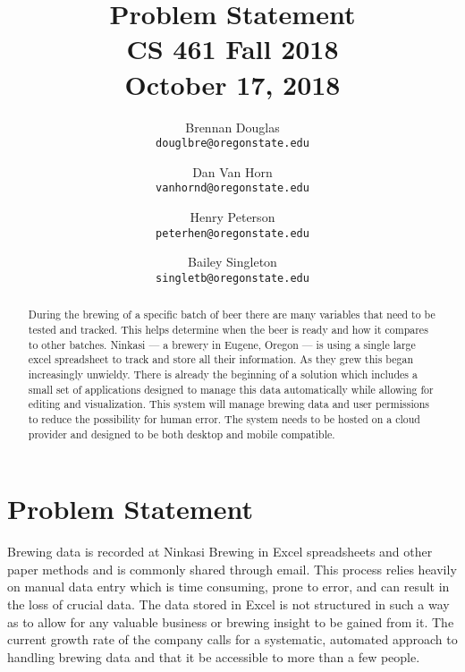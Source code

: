 \documentclass[draftclsnofoot,onecolumn,journal,letterpaper,10pt]{IEEEtran}
\begin{document}
\begin{titlepage}
    \title{Problem Statement\\\large CS 461 Fall 2018 \\ October 17, 2018}
    \author{
        Brennan Douglas \\
        \texttt{douglbre@oregonstate.edu} \\
        \and
        Dan Van Horn \\
        \texttt{vanhornd@oregonstate.edu} \\
        \and
        Henry Peterson \\
        \texttt{peterhen@oregonstate.edu} \\
        \and
        Bailey Singleton \\
        \texttt{singletb@oregonstate.edu} \\
    }
    
    \maketitle
    \begin{abstract}
        During the brewing of a specific batch of beer there are many variables that need to be tested and tracked. This helps determine when the beer is ready and how it compares to other batches. Ninkasi --- a brewery in Eugene, Oregon --- is using a single large excel spreadsheet to track and store all their information. As they grew this began increasingly unwieldy.  There is already the beginning of a solution which includes a small set of applications designed to manage this data automatically while allowing for editing and visualization.  This system will manage brewing data and user permissions to reduce the possibility for human error.  The system needs to be hosted on a cloud provider and designed to be both desktop and mobile compatible.
    \end{abstract}
\end{titlepage}



\section{Problem Statement}
Brewing data is recorded at Ninkasi Brewing in Excel spreadsheets and other paper methods and is commonly shared through email. This process relies heavily on manual data entry which is time consuming, prone to error, and can result in the loss of crucial data. The data stored in Excel is not structured in such a way as to allow for any valuable business or brewing insight to be gained from it. The current growth rate of the company calls for a systematic, automated approach to handling brewing data and that it be accessible to more than a few people.
\end{document}
